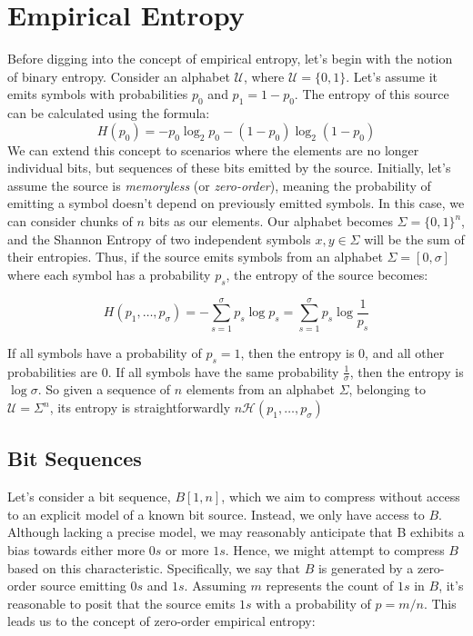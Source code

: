 
\section{Empirical Entropy}
Before digging into the concept of empirical entropy, let's begin with the notion of binary entropy. Consider an alphabet $\mathcal{U}$, where $\mathcal{U} = \{0, 1\}$. Let's assume it emits symbols with probabilities $p_0$ and $p_1 = 1 - p_0$. The entropy of this source can be calculated using the formula:
\[
    H(p_0) = -p_0 \log_2 p_0 - (1 - p_0) \log_2 (1 - p_0)
\]
We can extend this concept to scenarios where the elements are no longer individual bits, but sequences of these bits emitted by the source. Initially, let's assume the source is \emph{memoryless} (or \emph{zero-order}), meaning the probability of emitting a symbol doesn't depend on previously emitted symbols. In this case, we can consider chunks of $n$ bits as our elements. Our alphabet becomes $\Sigma = \{0, 1\}^n$, and the Shannon Entropy of two independent symbols $x, y \in \Sigma$ will be the sum of their entropies. Thus, if the source emits symbols from an alphabet $\Sigma = [0,\sigma]$ where each symbol has a probability $p_s$, the entropy of the source becomes:

\[
    H(p_1, \ldots, p_{\sigma}) = - \sum_{s=1}^{\sigma} p_s \log p_s = \sum_{s=1}^{\sigma} p_s \log \frac{1}{p_s}
\]

\begin{remark}
    If all symbols have a probability of $p_s =1$, then the entropy is $0$, and all other probabilities are $0$. If all symbols have the same probability $\frac{1}{\sigma}$, then the entropy is $\log \sigma$. So given a sequence of $n$ elements from an alphabet $\Sigma$, belonging to $\mathcal{U} = \Sigma^n$, its entropy is straightforwardly $n \mathcal{H}(p_1, \ldots, p_{\sigma})$
\end{remark}


\subsection{Bit Sequences}
Let's consider a bit sequence, $B[1, n]$, which we aim to compress without access to an explicit model of a known bit source. Instead, we only have access to $B$. Although lacking a precise model, we may reasonably anticipate that B exhibits a bias towards either more $0s$ or more $1s$. Hence, we might attempt to compress $B$ based on this characteristic. Specifically, we say that $B$ is generated by a zero-order source emitting $0s$ and $1s$. Assuming $m$ represents the count of $1s$ in $B$, it's reasonable to posit that the source emits $1s$ with a probability of $p = m/n$. This leads us to the concept of zero-order empirical entropy:


